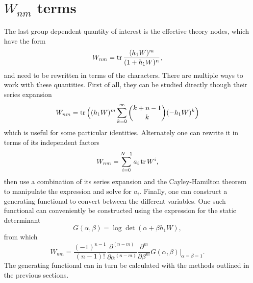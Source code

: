 \section{\texorpdfstring{$W_{nm}$}{Wnm} terms}
\label{sec:evaluating-polyakov-coupling-terms}

The last group dependent quantity of interest is the effective theory nodes,
which have the form
%
\begin{equation}
  W_{nm} = \operatorname{tr} \frac{(h_1 W)^m}{(1 + h_1 W)^n},
\end{equation}
%
and need to be rewritten in terms of the characters. There are multiple ways to
work with these quantities. First of all, they can be studied directly though
their series expansion
%
\begin{equation}
  W_{nm} = \operatorname{tr} \Big( (h_1 W)^m \sum_{k=0}^{\infty} \binom{k + n - 1}{k} (-h_1 W)^k \Big)
\end{equation}
%
which is useful for some particular identities. Alternately one can rewrite it in
terms of its independent factors
%
\begin{equation}
  W_{nm} = \sum_{i=0}^{N-1} a_i \operatorname{tr}{W^i},
\end{equation}
%
then use a combination of its series expansion and the Cayley-Hamilton theorem
to manipulate the expression and solve for $a_i$. Finally, one can construct a
generating functional to convert between the different variables. One such
functional can conveniently be constructed using the expression for the static
determinant
%
\begin{equation}
  G(\alpha,\beta) = \log \det ( \alpha + \beta h_1 W ),
\end{equation}
%
from which
%
\begin{equation}
  W_{nm} = \frac{(-1)^{n-1}}{(n-1)!} \frac{\partial^{(n-m)}}{\partial \alpha^{(n-m)}}
    \frac{\partial^{m}}{\partial \beta^m} G(\alpha,\beta)
    \bigg|_{\alpha=\beta=1}.
\end{equation}
%
The generating functional can in turn be calculated with the methods outlined in
the previous sections.
